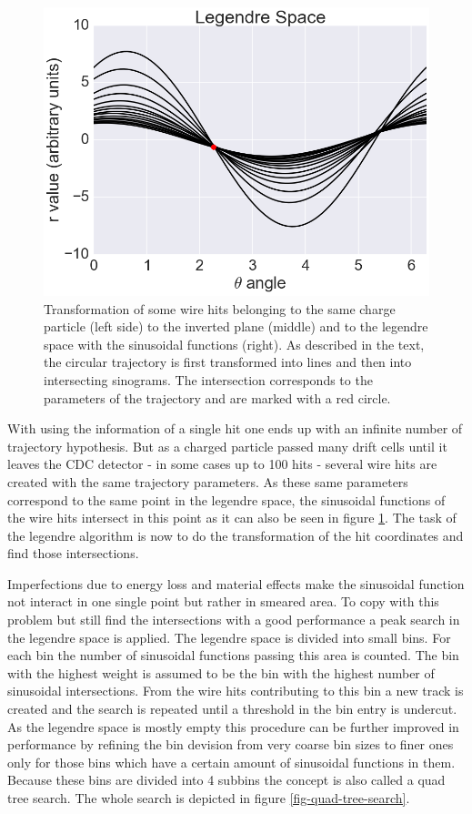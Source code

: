 \begin{figure}
 \includegraphics[scale=0.2]{figures/theory/legendre_3.png}
 \caption{Transformation of some wire hits belonging to the same charge particle (left side) to the inverted plane (middle) and to the legendre space with the sinusoidal functions (right). As described in the text, the circular trajectory is first transformed into lines and then into intersecting sinograms. The intersection corresponds to the parameters of the trajectory and are marked with a red circle.}
 \label{fig-legendre-explained}
\end{figure}

With using the information of a single hit one ends up with an infinite number of trajectory hypothesis. But as a charged particle passed many drift cells until it leaves the CDC detector - in some cases up to 100 hits - several wire hits are created with the same trajectory parameters. As these same parameters correspond to the same point in the legendre space, the sinusoidal functions of the wire hits intersect in this point as it can also be seen in figure \ref{fig-legendre-explained}. The task of the legendre algorithm is now to do the transformation of the hit coordinates and find those intersections.

Imperfections due to energy loss and material effects make the sinusoidal function not interact in one single point but rather in smeared area. To copy with this problem but still find the intersections with a good performance a peak search in the legendre space is applied. The legendre space is divided into small bins. For each bin the number of sinusoidal functions passing this area is counted. The bin with the highest weight is assumed to be the bin with the highest number of sinusoidal intersections. From the wire hits contributing to this bin a new track is created and the search is repeated until a threshold in the bin entry is undercut. As the legendre space is mostly empty this procedure can be further improved in performance by refining the bin devision from very coarse bin sizes to finer ones only for those bins which have a certain amount of sinusoidal functions in them. Because these bins are divided into 4 subbins the concept is also called a quad tree search. The whole search is depicted in figure \ref{fig-quad-tree-search}.

